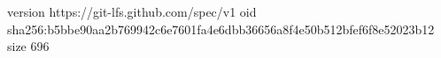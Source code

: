 version https://git-lfs.github.com/spec/v1
oid sha256:b5bbe90aa2b769942c6e7601fa4e6dbb36656a8f4e50b512bfef6f8e52023b12
size 696

